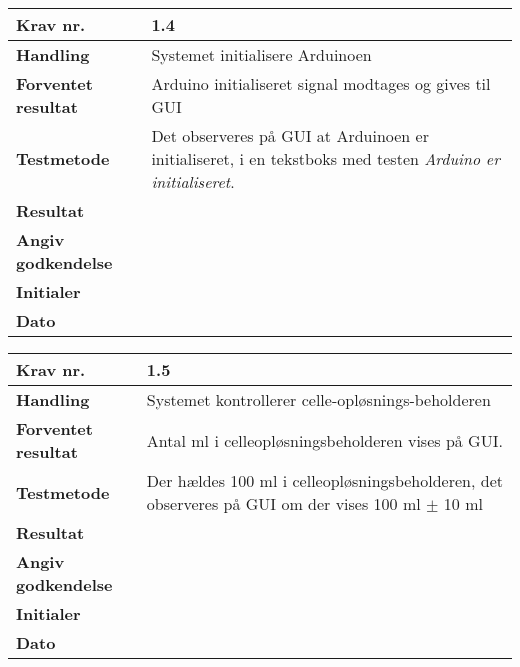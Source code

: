 	\begin{center}
		\begin{longtable}{ | m{4cm}| m{8.5cm}|} 
			\hline
			\textbf{Krav nr.} & 1.4    \\ 
			\hline
			\textbf{Handling} &  Systemet initialisere Arduinoen   \\
			\hline
			\textbf{Forventet resultat} &  Arduino initialiseret signal modtages og gives til GUI  \\
			\hline
			\textbf{Testmetode}  & Det observeres på GUI at Arduinoen er initialiseret, i en tekstboks med testen \textit{Arduino er initialiseret}.   \\
			\hline
			\textbf{Resultat}  &    \\
			\hline
			\textbf{Angiv godkendelse} &     \\
			\hline
			\textbf{Initialer} &     \\
			\hline
			\textbf{Dato} &    \\
			\hline
		\end{longtable}
	\end{center}
	
	\begin{center}
		\begin{longtable}{ | m{4cm}| m{8.5cm}|} 
			\hline
			\textbf{Krav nr.} & 1.5    \\ 
			\hline
			\textbf{Handling} &  Systemet kontrollerer celle-opløsnings-beholderen  \\
			\hline
			\textbf{Forventet resultat} &  Antal ml i celleopløsningsbeholderen vises på GUI.  \\
			\hline
			\textbf{Testmetode}  & Der hældes 100 ml i celleopløsningsbeholderen, det observeres på GUI om der vises 100 ml $\pm$ 10 ml   \\
			\hline			
			\textbf{Resultat}  &    \\
			\hline
			\textbf{Angiv godkendelse} &     \\
			\hline
			\textbf{Initialer} &     \\
			\hline
			\textbf{Dato} &    \\
			\hline
		\end{longtable}
	\end{center}	
	
